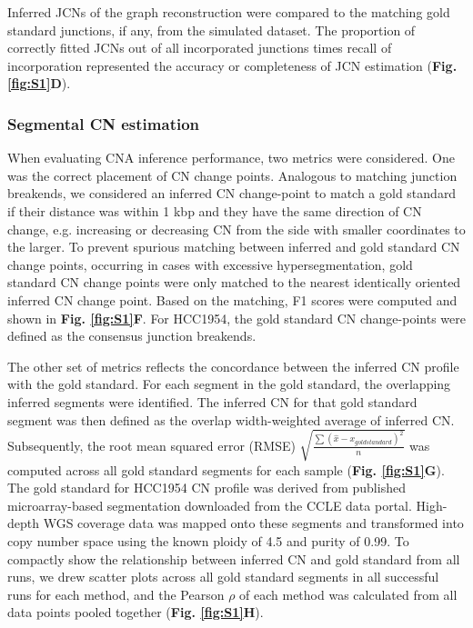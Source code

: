 \documentclass[phd,tocprelim]{cornell}
\begin{document}
Inferred JCNs of the graph reconstruction were compared to the matching gold standard junctions, if any, from the simulated dataset. The proportion of correctly fitted JCNs out of all incorporated junctions times recall of incorporation represented the accuracy or completeness of JCN estimation (\textbf{Fig. \ref{fig:S1}D}).

\subsubsection*{Segmental CN estimation}
When evaluating CNA inference performance, two metrics were considered. One was the correct placement of CN change points. Analogous to matching junction breakends, we considered an inferred CN change-point to match a gold standard if their distance was within 1 kbp and they have the same direction of CN change, e.g. increasing or decreasing CN from the side with smaller coordinates to the larger. To prevent spurious matching between inferred and gold standard CN change points, occurring in cases with excessive hypersegmentation, gold standard CN change points were only matched to the nearest identically oriented inferred CN change point.  Based on the matching, F1 scores were computed and shown in \textbf{Fig. \ref{fig:S1}F}. For HCC1954, the gold standard CN change-points were defined as the consensus junction breakends.


The other set of metrics reflects the concordance between the inferred CN profile with the gold standard. For each segment in the gold standard, the overlapping inferred segments were identified. The inferred CN for that gold standard segment was then defined as the overlap width-weighted average of inferred CN. Subsequently, the root mean squared error (RMSE) $\sqrt{\frac{\sum{(\hat{x} - x_{goldstandard})^2}}{n}}$ was computed across all gold standard segments for each sample (\textbf{Fig. \ref{fig:S1}G}). The gold standard for HCC1954 CN profile was derived from published microarray-based segmentation downloaded from the CCLE data portal. High-depth WGS coverage data was mapped onto these segments and transformed into copy number space using the known ploidy of 4.5 and purity of 0.99. To compactly show the relationship between inferred CN and gold standard from all runs, we drew scatter plots across all gold standard segments in all successful runs for each method, and the Pearson $\rho$ of each method was calculated from all data points pooled together (\textbf{Fig. \ref{fig:S1}H}).
\end{document}
